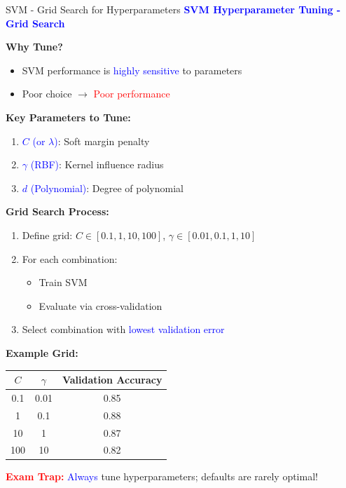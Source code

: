 \documentclass[8pt]{beamer}
\begin{document}
	\begin{frame}{SVM - Grid Search for Hyperparameters}
		\fontsize{6.5}{7.5}\selectfont
		\textcolor{blue}{\textbf{SVM Hyperparameter Tuning - Grid Search}}
		
		\textbf{Why Tune?}
		\begin{itemize}
			\item SVM performance is \textcolor{blue}{highly sensitive} to parameters
			\item Poor choice $\rightarrow$ \textcolor{red}{Poor performance}
		\end{itemize}
		
		\textbf{Key Parameters to Tune:}
		\begin{enumerate}
			\item \textcolor{blue}{$C$ (or $\lambda$)}: Soft margin penalty
			\item \textcolor{blue}{$\gamma$ (RBF)}: Kernel influence radius
			\item \textcolor{blue}{$d$ (Polynomial)}: Degree of polynomial
		\end{enumerate}
		
		\textbf{Grid Search Process:}
		\begin{enumerate}
			\item Define grid: $C \in [0.1, 1, 10, 100]$, $\gamma \in [0.01, 0.1, 1, 10]$
			\item For each combination:
			\begin{itemize}
				\item Train SVM
				\item Evaluate via cross-validation
			\end{itemize}
			\item Select combination with \textcolor{blue}{lowest validation error}
		\end{enumerate}
		
		\textbf{Example Grid:}
		\begin{tabular}{|c|c|c|}
			\hline
			\textbf{$C$} & \textbf{$\gamma$} & \textbf{Validation Accuracy} \\
			\hline
			0.1 & 0.01 & 0.85 \\
			\hline
			1 & 0.1 & 0.88 \\
			\hline
			10 & 1 & 0.87 \\
			\hline
			100 & 10 & 0.82 \\
			\hline
		\end{tabular}
		
		\textcolor{red}{\textbf{Exam Trap:}} \textcolor{blue}{Always} tune hyperparameters; defaults are rarely optimal!
	\end{frame}
	
\end{document}
